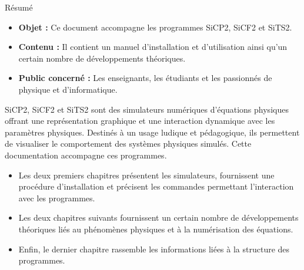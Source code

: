 \begin{center}
\Large
Résumé
\normalsize
\end{center}
\vspace{3cm}
\begin{itemize}[leftmargin=1cm, label=, itemsep=21pt]
\item {\bf Objet : }Ce document accompagne les programmes SiCP2, SiCF2 et SiTS2.
\item {\bf Contenu : }Il contient un manuel d'installation et d'utilisation ainsi qu'un certain nombre de développements théoriques.
\item {\bf Public concerné : }Les enseignants, les étudiants et les passionnés de physique et d'informatique.
\end{itemize}

\vspace{3cm}

SiCP2, SiCF2 et SiTS2 sont des simulateurs numériques d'équations physiques offrant une représentation graphique et une interaction dynamique avec les paramètres physiques. Destinés à un usage ludique et pédagogique, ils permettent de visualiser le comportement des systèmes physiques simulés. Cette documentation accompagne ces programmes.

\begin{itemize}[leftmargin=1cm, label=, itemsep=11pt]
\item Les deux premiers chapitres présentent les simulateurs, fournissent une procédure d'installation et précisent les commandes permettant l'interaction avec les programmes.
\item Les deux chapitres suivants fournissent un certain nombre de développements théoriques liés au phénomènes physiques et à la numérisation des équations.
\item Enfin, le dernier chapitre rassemble les informations liées à la structure des programmes.
\end{itemize}
